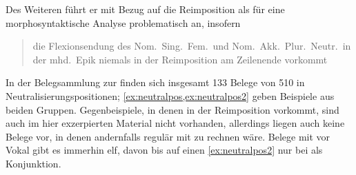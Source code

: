 Des Weiteren führt er mit Bezug auf \citet[662--663]{grimm1870} die
Reimposition als für eine morphosyntaktische Analyse problematisch an, insofern
\blockcquote[89]{askedal1973}{die Flexionsendung  des Nom.\ Sing.\
Fem.\ und Nom.\ Akk.\ Plur.\ Neutr.\ in der mhd.\ Epik niemals in der
Reimposition am Zeilenende vorkommt}. In der Belegsammlung zur \KC{}
finden sich insgesamt 133 Belege von 510 in Neutralisierungspositionen;
\cref{ex:neutralpos,ex:neutralpos2} geben Beispiele aus beiden Gruppen.
Gegenbeispiele, in denen \norm{bėidiu} in der Reimposition vorkommt, sind auch
im hier exzerpierten Material nicht vorhanden, allerdings liegen auch keine
Belege vor, in denen andernfalls regulär mit \norm{-iu} zu rechnen wäre. Belege
mit \norm{iu} vor Vokal gibt es immerhin elf, davon bis auf einen
\cref{ex:neutralpos2} nur bei \norm{bėide} als Konjunktion.

